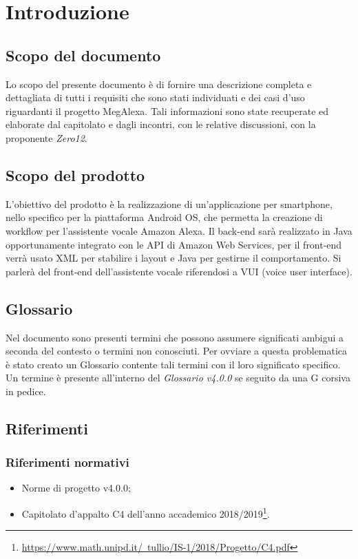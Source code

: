 \clearpage
\section{Introduzione}
\label{sec:intro}
\subsection{Scopo del documento}
Lo scopo del presente documento è di fornire una descrizione completa e dettagliata di tutti i requisiti che sono stati individuati e dei casi d'uso riguardanti il progetto MegAlexa.
Tali informazioni sono state recuperate ed elaborate dal capitolato e dagli incontri, con le relative discussioni, con la proponente \emph{Zero12}.
\subsection{Scopo del prodotto}
L'obiettivo del prodotto è la realizzazione di un'applicazione per smartphone, nello specifico per la piattaforma Android OS, che permetta la creazione di workflow per l'assistente vocale Amazon Alexa. Il back-end sarà realizzato in Java opportunamente integrato con le API di Amazon Web Services, per il front-end verrà usato XML per stabilire i layout e Java per gestirne il comportamento. Si parlerà del front-end dell'assistente vocale riferendosi a VUI (voice user interface).
\subsection{Glossario}
Nel documento sono presenti termini che possono assumere significati ambigui a seconda del contesto o termini non conosciuti. Per ovviare a questa problematica è stato creato un Glossario contente tali termini con il loro significato specifico. Un termine è presente all'interno del \emph{Glossario v4.0.0} se seguito da una G corsiva in pedice.
\subsection{Riferimenti}
\subsubsection{Riferimenti normativi}
\begin{itemize}
	\item Norme di progetto v4.0.0;
	\item Capitolato d’appalto C4 dell'anno accademico 2018/2019\footnote{\href{https://www.math.unipd.it/~tullio/IS-1/2018/Progetto/C4.pdf}{https://www.math.unipd.it/~tullio/IS-1/2018/Progetto/C4.pdf}}.
\end{itemize}
